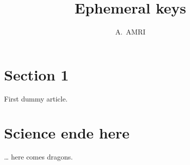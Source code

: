 \documentclass[a4paper,11pt]{article}
\author{A.~AMRI}
\title{Ephemeral keys}
\begin{document}
\maketitle
\tableofcontents
\section{Section 1}
First dummy article.
\section{Science ende here}
\ldots{} here comes dragons.
\end{document}
